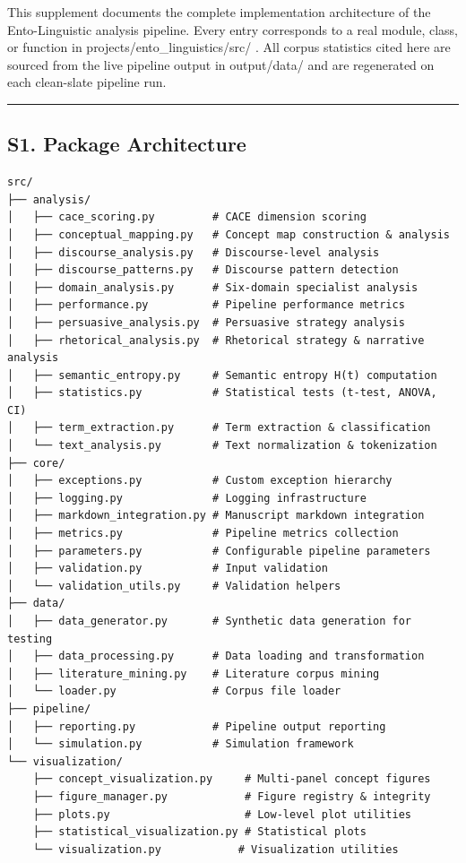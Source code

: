 \documentclass[
]{article}
\numberwithin{equation}{section}
\renewcommand{\texttt}[1]{%
    \colorbox{codebg}{\color{codefg}\ttfamily #1}%
}
\begin{document}
This supplement documents the complete implementation architecture of
the Ento-Linguistic analysis pipeline. Every entry corresponds to a real
module, class, or function in \texttt{projects/ento\_linguistics/src/}.
All corpus statistics cited here are sourced from the live pipeline
output in \texttt{output/data/} and are regenerated on each clean-slate
pipeline run.

\begin{center}\rule{0.5\linewidth}{0.5pt}\end{center}

\subsection{S1. Package Architecture}\label{s1.-package-architecture}

\begin{verbatim}
src/
├── analysis/
│   ├── cace_scoring.py         # CACE dimension scoring
│   ├── conceptual_mapping.py   # Concept map construction & analysis
│   ├── discourse_analysis.py   # Discourse-level analysis
│   ├── discourse_patterns.py   # Discourse pattern detection
│   ├── domain_analysis.py      # Six-domain specialist analysis
│   ├── performance.py          # Pipeline performance metrics
│   ├── persuasive_analysis.py  # Persuasive strategy analysis
│   ├── rhetorical_analysis.py  # Rhetorical strategy & narrative analysis
│   ├── semantic_entropy.py     # Semantic entropy H(t) computation
│   ├── statistics.py           # Statistical tests (t-test, ANOVA, CI)
│   ├── term_extraction.py      # Term extraction & classification
│   └── text_analysis.py        # Text normalization & tokenization
├── core/
│   ├── exceptions.py           # Custom exception hierarchy
│   ├── logging.py              # Logging infrastructure
│   ├── markdown_integration.py # Manuscript markdown integration
│   ├── metrics.py              # Pipeline metrics collection
│   ├── parameters.py           # Configurable pipeline parameters
│   ├── validation.py           # Input validation
│   └── validation_utils.py     # Validation helpers
├── data/
│   ├── data_generator.py       # Synthetic data generation for testing
│   ├── data_processing.py      # Data loading and transformation
│   ├── literature_mining.py    # Literature corpus mining
│   └── loader.py               # Corpus file loader
├── pipeline/
│   ├── reporting.py            # Pipeline output reporting
│   └── simulation.py           # Simulation framework
└── visualization/
    ├── concept_visualization.py     # Multi-panel concept figures
    ├── figure_manager.py            # Figure registry & integrity
    ├── plots.py                     # Low-level plot utilities
    ├── statistical_visualization.py # Statistical plots
    └── visualization.py            # Visualization utilities
\end{verbatim}
\end{document}
